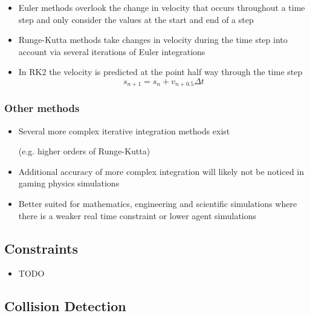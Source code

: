 \documentclass[a4paper]{article}
\begin{document}
\begin{itemize}
  \item
    Euler methods overlook the change in velocity that occurs throughout a time
    step and only consider the values at the start and end of a step

  \item
    Runge-Kutta methods take changes in velocity during the time step into
    account via several iterations of Euler integrations

  \item
    In RK2 the velocity is predicted at the point half way through the time step
    \[
      s_{n + 1} = s_{n} + v_{n + 0.5} \Delta t
    \]

\end{itemize}

\subsubsection{Other methods}

\begin{itemize}
  \item
    Several more complex iterative integration methods exist

    (e.g. higher orders of Runge-Kutta)

  \item
    Additional accuracy of more complex integration will likely not be noticed
    in gaming physics simulations

  \item
    Better suited for mathematics, engineering and scientific simulations where
    there is a weaker real time constraint or lower agent simulations

\end{itemize}

\subsection{Constraints}

\begin{itemize}
  \item
    TODO

\end{itemize}

\subsection{Collision Detection}
\end{document}
